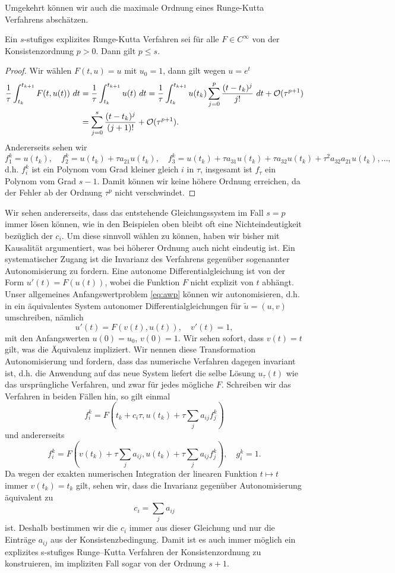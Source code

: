 Umgekehrt können wir auch die maximale Ordnung eines Runge-Kutta Verfahrens abschätzen.
%
\begin{lemma}{}{}
Ein $s$-stufiges explizites Runge-Kutta Verfahren sei für alle $F \in C^\infty$ von der Konsistenzordnung $p> 0$. Dann gilt $p \leq s $.
\end{lemma} 
\begin{proof}
Wir wählen $F(t,u)=u$ mit $u_0=1$, dann gilt  wegen $u=e^t$
\begin{align*} \frac{1}\tau \int_{t_k}^{t_{k+1}} F(t,u(t))~dt &= \frac{1}\tau \int_{t_k}^{t_{k+1}} u(t)~dt =  \frac{1}\tau \int_{t_k}^{t_{k+1}}  u(t_k) \sum_{j=0}^p \frac{(t-t_k)^j}{j!}~dt + {\cal O}(\tau^{p+1}) \\ &= \sum_{j=0}^s \frac{(t-t_k)^j}{(j+1)!} + {\cal O}(\tau^{p+1}). \end{align*}
Andererseits sehen wir
$$ f_1^k  = u(t_k), \quad f_2^k = u(t_k) + \tau a_{21} u(t_k), \quad f_3^k  = u(t_k) + \tau a_{31} u(t_k) + \tau a_{32} u(t_k) +
\tau^2 a_{32} a_{21} u(t_k) , \ldots,$$
d.h. $f_i^k$ ist ein Polynom vom Grad kleiner gleich $i$ in $\tau$, insgesamt ist $f_\tau$ ein Polynom vom Grad $s-1$. Damit können wir keine höhere Ordnung erreichen, da der Fehler ab der Ordnung $\tau^p$ nicht verschwindet.
\end{proof}

Wir sehen andererseits, dass das entstehende Gleichungssystem im Fall $s=p$ immer lösen können, wie in den Beispielen oben bleibt oft eine Nichteindeutigkeit bezüglich der $c_i$. Um diese sinnvoll wählen zu können, haben wir bisher mit Kausalität argumentiert, was bei höherer Ordnung auch nicht eindeutig ist. Ein systematischer Zugang ist die Invarianz des Verfahrens gegenüber sogenannter Autonomisierung zu fordern. Eine autonome Differentialgleichung ist von der Form $u'(t) = F(u(t))$, wobei die Funktion $F$ nicht explizit von $t$ abhängt. Unser allgemeines Anfangswertproblem \eqref{eq:awp} können wir autonomisieren, d.h. in ein äquivalentes System autonomer Differentialgleichungen für $\tilde u = (u,v)$ umschreiben, nämlich
$$ u'(t) = F(v(t),u(t)), \quad v'(t) =1, $$
mit den Anfangswerten $u(0)=u_0$, $v(0)=1$. Wir sehen sofort, dass $v(t) =t $ gilt, was die Äquivalenz impliziert. Wir nennen diese Transformation Autonomisierung und fordern, dass das numerische Verfahren dagegen invariant ist, d.h. die Anwendung auf das neue System liefert die selbe Lösung $u_\tau(t)$ wie das ursprüngliche Verfahren, und zwar für jedes mögliche $F$. Schreiben wir das Verfahren in beiden Fällen hin, so gilt einmal
$$ f_i^k = F(t_k + c_i \tau,u(t_k) + \tau \sum_j a_{ij} f_j^k) $$
und andererseits
$$ f_i^k = F(v(t_k) + \tau \sum_{j} a_{ij},u(t_k) +  \tau \sum_j a_{ij} f_j^k) , \quad g_i^k =1. $$
Da wegen der exakten numerischen Integration der linearen Funktion $t \mapsto t$ immer $v(t_k) = t_k$ gilt, sehen wir, dass die Invarianz gegenüber Autonomisierung äquivalent zu
$$ c_i = \sum_j a_{ij} $$
ist. Deshalb bestimmen wir die $c_i$ immer aus dieser Gleichung und nur die Einträge $a_{ij}$ aus der Konsistenzbedingung. Damit ist es auch immer möglich ein explizites s-stufiges Runge--Kutta Verfahren der Konsistenzordnung zu konstruieren, im impliziten Fall sogar von der Ordnung $s+1$.
%

